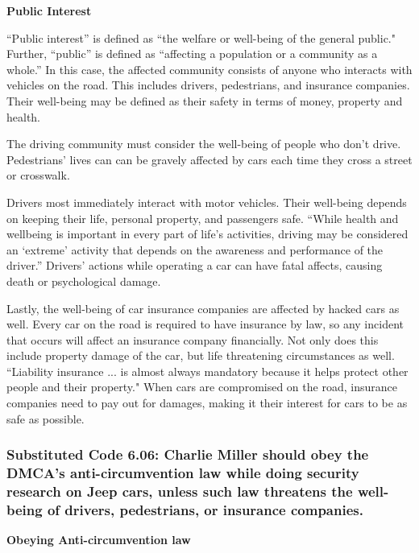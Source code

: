 \documentclass[12pt]{article}
\begin{document}
\begin{multicols}{2}
\vspace{.5cm}\hspace{-.5cm}\textbf{Public Interest}\vspace{.2cm}

``Public interest'' is defined as ``the welfare or well-being of the general public."\cite{dictionary} Further, ``public'' is defined as ``affecting a population or a community as a whole.''\cite{dictionary} In this case, the affected community consists of anyone who interacts with vehicles on the road. This includes drivers, pedestrians, and insurance companies. Their well-being may be defined as their safety in terms of money, property and health.

The driving community must consider the well-being of people who don't drive. Pedestrians' lives can can be gravely affected by cars each time they cross a street or crosswalk. 

Drivers most immediately interact with motor vehicles. Their well-being depends on keeping their life, personal property, and passengers safe. ``While health and wellbeing is important in every part of life’s activities, driving may be considered an ‘extreme’ activity that depends on the awareness and performance of the driver.''\cite{driverWellBeing} Drivers' actions while operating a car can have fatal affects, causing death or psychological damage.

Lastly, the well-being of car insurance companies are affected by hacked cars as well. Every car on the road is required to have insurance by law,\cite{insurance} so any incident that occurs will affect an insurance company financially. Not only does this include property damage of the car, but life threatening circumstances as well. ``Liability insurance ... is almost always mandatory because it helps protect other people and their property."\cite{insurance} When cars are compromised on the road, insurance companies need to pay out for damages, making it their interest for cars to be as safe as possible.

\subsubsection{Substituted Code 6.06: Charlie Miller should obey the DMCA's anti-circumvention law while doing security research on Jeep cars, unless such law threatens the well-being of drivers, pedestrians, or insurance companies.}

\textbf{Obeying Anti-circumvention law }\vspace{.2cm}


\end{multicols}
\end{document}
